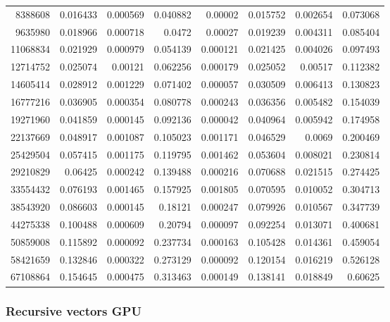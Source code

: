 \begin{longtable}{r r r r r r r r}
8388608 & 0.016433 & 0.000569 & 0.040882 & 0.00002 & 0.015752 & 0.002654 & 0.073068 \\
9635980 & 0.018966 & 0.000718 & 0.0472 & 0.00027 & 0.019239 & 0.004311 & 0.085404 \\
11068834 & 0.021929 & 0.000979 & 0.054139 & 0.000121 & 0.021425 & 0.004026 & 0.097493 \\
12714752 & 0.025074 & 0.00121 & 0.062256 & 0.000179 & 0.025052 & 0.00517 & 0.112382 \\
14605414 & 0.028912 & 0.001229 & 0.071402 & 0.000057 & 0.030509 & 0.006413 & 0.130823 \\
16777216 & 0.036905 & 0.000354 & 0.080778 & 0.000243 & 0.036356 & 0.005482 & 0.154039 \\
19271960 & 0.041859 & 0.000145 & 0.092136 & 0.000042 & 0.040964 & 0.005942 & 0.174958 \\
22137669 & 0.048917 & 0.001087 & 0.105023 & 0.001171 & 0.046529 & 0.0069 & 0.200469 \\
25429504 & 0.057415 & 0.001175 & 0.119795 & 0.001462 & 0.053604 & 0.008021 & 0.230814 \\
29210829 & 0.06425 & 0.000242 & 0.139488 & 0.000216 & 0.070688 & 0.021515 & 0.274425 \\
33554432 & 0.076193 & 0.001465 & 0.157925 & 0.001805 & 0.070595 & 0.010052 & 0.304713 \\
38543920 & 0.086603 & 0.000145 & 0.18121 & 0.000247 & 0.079926 & 0.010567 & 0.347739 \\
44275338 & 0.100488 & 0.000609 & 0.20794 & 0.000097 & 0.092254 & 0.013071 & 0.400681 \\
50859008 & 0.115892 & 0.000092 & 0.237734 & 0.000163 & 0.105428 & 0.014361 & 0.459054 \\
58421659 & 0.132846 & 0.000322 & 0.273129 & 0.000092 & 0.120154 & 0.016219 & 0.526128 \\
67108864 & 0.154645 & 0.000475 & 0.313463 & 0.000149 & 0.138141 & 0.018849 & 0.60625 \\
\end{longtable}

\subsubsection{Recursive vectors GPU}


